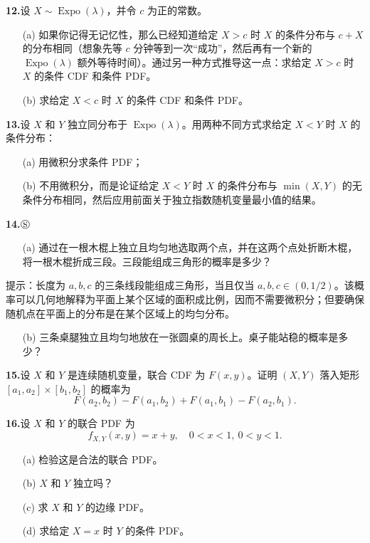 \documentclass[UTF8, 12pt, fontset=fandol, oneside]{ctexart}
\begin{document}
\noindent\textbf{12.}\quad 设 $X\sim \operatorname{Expo}(\lambda)$，并令 $c$ 为正的常数。
\begin{enumerate}
  \item[(a)] 如果你记得无记忆性，那么已经知道给定 $X>c$ 时 $X$ 的条件分布与 $c+X$ 的分布相同（想象先等 $c$ 分钟等到一次“成功”，然后再有一个新的 $\operatorname{Expo}(\lambda)$ 额外等待时间）。通过另一种方式推导这一点：求给定 $X>c$ 时 $X$ 的条件 CDF 和条件 PDF。
  \item[(b)] 求给定 $X<c$ 时 $X$ 的条件 CDF 和条件 PDF。
\end{enumerate}

\noindent\textbf{13.}\quad 设 $X$ 和 $Y$ 独立同分布于 $\operatorname{Expo}(\lambda)$。用两种不同方式求给定 $X<Y$ 时 $X$ 的条件分布：
\begin{enumerate}
  \item[(a)] 用微积分求条件 PDF；
  \item[(b)] 不用微积分，而是论证给定 $X<Y$ 时 $X$ 的条件分布与 $\min(X,Y)$ 的无条件分布相同，然后应用前面关于独立指数随机变量最小值的结果。
\end{enumerate}

\noindent\textbf{14.}\quad $\circledS$
\begin{enumerate}
  \item[(a)] 通过在一根木棍上独立且均匀地选取两个点，并在这两个点处折断木棍，将一根木棍折成三段。三段能组成三角形的概率是多少？
\end{enumerate}
提示：长度为 $a,b,c$ 的三条线段能组成三角形，当且仅当 $a,b,c\in(0,1/2)$。该概率可以几何地解释为平面上某个区域的面积成比例，因而不需要微积分；但要确保随机点在平面上的分布是在某个区域上的均匀分布。
\begin{enumerate}
  \item[(b)] 三条桌腿独立且均匀地放在一张圆桌的周长上。桌子能站稳的概率是多少？
\end{enumerate}

\noindent\textbf{15.}\quad 设 $X$ 和 $Y$ 是连续随机变量，联合 CDF 为 $F(x,y)$。证明 $(X,Y)$ 落入矩形 $[a_1,a_2]\times [b_1,b_2]$ 的概率为
\[
  F(a_2,b_2)-F(a_1,b_2)+F(a_1,b_1)-F(a_2,b_1).
\]

\noindent\textbf{16.}\quad 设 $X$ 和 $Y$ 的联合 PDF 为
\[
  f_{X,Y}(x,y)=x+y,\quad 0<x<1,\ 0<y<1.
\]
\begin{enumerate}
  \item[(a)] 检验这是合法的联合 PDF。
  \item[(b)] $X$ 和 $Y$ 独立吗？
  \item[(c)] 求 $X$ 和 $Y$ 的边缘 PDF。
  \item[(d)] 求给定 $X=x$ 时 $Y$ 的条件 PDF。
\end{enumerate}
\end{document}
